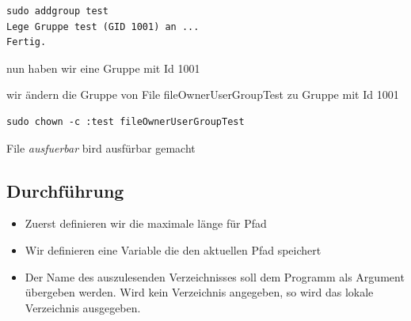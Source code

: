 \begin{lstlisting}
sudo addgroup test
Lege Gruppe test (GID 1001) an ...
Fertig.
\end{lstlisting}
nun haben wir eine Gruppe mit Id 1001

wir ändern die Gruppe von File fileOwnerUserGroupTest zu Gruppe mit Id 1001
\begin{lstlisting}
sudo chown -c :test fileOwnerUserGroupTest
\end{lstlisting}
File \textit{ausfuerbar} bird ausfürbar gemacht

\subsection{Durchführung}
\begin{itemize}
	\item Zuerst definieren wir die maximale länge für Pfad 
\item Wir definieren eine Variable die den aktuellen Pfad speichert 
	\item Der Name des auszulesenden Verzeichnisses soll dem Programm als Argument übergeben
 werden. Wird kein Verzeichnis angegeben, so wird das lokale Verzeichnis ausgegeben.


\end{itemize}
